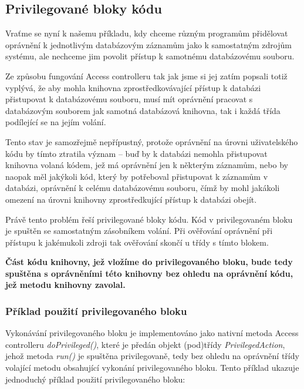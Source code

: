 \subsection{Privilegované bloky kódu}\label{privilegovaneBloky}

Vraťme se nyní k našemu příkladu, kdy chceme různým programům přidělovat oprávnění k jednotlivým databázovým záznamům jako k samostatným zdrojům systému, ale nechceme jim povolit přístup k samotnému databázovému souboru.

Ze způsobu fungování Access controlleru tak jak jsme si jej zatím popsali totiž vyplývá, že aby mohla knihovna zprostředkovávající přístup k databázi přistupovat k databázovému souboru, musí mít oprávnění pracovat s databázovým souborem jak samotná databázová knihovna, tak i každá třída podílející se na jejím volání.

Tento stav je samozřejmě nepřípustný, protože oprávnění na úrovni uživatelského kódu by tímto ztratila význam -- buď by k databázi nemohla přistupovat knihovna volaná kódem, jež má oprávnění jen k některým záznamům, nebo by naopak měl jakýkoli kód, který by potřeboval přistupovat k záznamům v databázi, oprávnění k celému databázovému souboru, čímž by mohl jakákoli omezení na úrovni knihovny zprostředkující přístup k databázi obejít.

Právě tento problém řeší privilegované bloky kódu. Kód v privilegovaném bloku je spuštěn se samostatným zásobníkem volání. Při ověřování oprávnění při přístupu k jakémukoli zdroji tak ověřování skončí u třídy s tímto blokem.

{\bf Část kódu knihovny, jež vložíme do privilegovaného bloku, bude tedy spuštěna s oprávněními této knihovny bez ohledu na oprávnění kódu, jež metodu knihovny zavolal.}

\subsubsection{Příklad použití privilegovaného bloku}

Vykonávání privilegovaného bloku je implementováno jako nativní metoda Access controlleru {\it doPrivileged()}, které je předán objekt (pod)třídy {\it PrivilegedAction}, jehož metoda {\it run()} je spuštěna privilegovaně, tedy bez ohledu na oprávnění třídy volající metodu obsahující vykonání privilegovaného bloku.
Tento příklad ukazuje jednoduchý příklad použití privilegovaného bloku: \cite{refAccessController}

